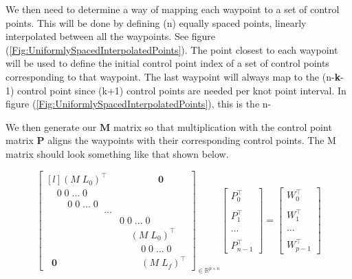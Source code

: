 \documentclass{article}
\begin{document}
We then need to determine a way of mapping each waypoint to a set of control points. This will be done by defining (n) equally spaced points, linearly interpolated between all the waypoints. See figure (\ref{Fig:UniformlySpacedInterpolatedPoints}). The point closest to each waypoint will be used to define the initial control point index of a set of control points corresponding to that waypoint. The last waypoint will always map to the (n-\textbf{k}-1) control point since (k+1) control points are needed per knot point interval. In figure (\ref{Fig:UniformlySpacedInterpolatedPoints}), this is the n-

We then generate our \(\textbf{M}\) matrix so that multiplication with the control point matrix \(\textbf{P}\) aligns the waypoints with their corresponding control points. The M matrix should look something like that shown below.

\begin{equation}
    \begin{bmatrix*}[l] (M \; L_0)^{\intercal} & \qquad \qquad \textbf{0} \\
    \;\; \;\; 0 \; 0 \; ... \; 0 & \\
    \;\; \;\; \;\; \;\; 0 \; 0 \; ... \; 0 & \\
    \qquad \qquad \qquad ... & \\
     & 0 \; 0 \; ... \; 0 \;\; \;\; \;\; \;\; \\
     & \;\;\;\; (M \; L_0)^{\intercal} \;\; \;\; \\
     & \;\;\;\;\;\;\;\; 0 \; 0 \; ... \; 0 \\
    \;\; \textbf{0} & \;\;\;\;\;\;\;\; (M \; L_f)^{\intercal}
    \end{bmatrix*}_{\in \mathbb{R}^{p \times n}} 
    \begin{bmatrix}
        P_0^{\intercal} \\\\ P_1^\intercal \\\\ ... \\\\ P_{n-1}^\intercal
    \end{bmatrix} = 
    \begin{bmatrix} W_0^{\intercal} \\\\ W_1^{\intercal}  \\\\ ... \\\\ W_{p-1}^{\intercal} \end{bmatrix}
\end{equation}
\end{document}
